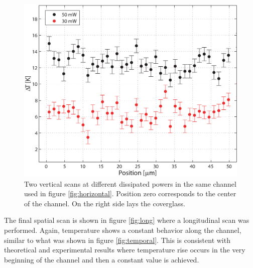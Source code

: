 \documentclass[9pt,twocolumn,twoside]{osajnl}
\begin{document}
\begin{figure}[htbp]
\centering
\includegraphics[width=\columnwidth]{figs/fig6.eps}
\caption{Two vertical scans at different dissipated powers in the same channel used in figure \ref{fig:horizontal}. Position zero corresponds to the center of the channel. On the right side lays the coverglass.\label{fig:vertical}}
\end{figure}

The final spatial scan is shown in figure \ref{fig:long} where a longitudinal scan was performed. Again, temperature shows a constant behavior along the channel, similar to what was shown in figure \ref{fig:temporal}. This is consistent with theoretical and experimental results \cite{jouleteorico,xuan2008} where temperature rise occurs in the very beginning of the channel and then a constant value is achieved. 

%
\end{document}
